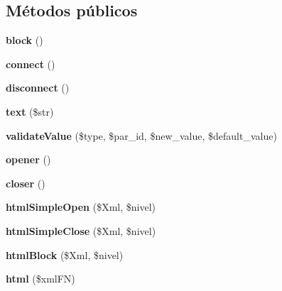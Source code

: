 \subsection*{Métodos públicos}
\begin{DoxyCompactItemize}
\item 
\mbox{\label{classblock_a9b390283efee92f54e6eed6c281155ad}} 
{\bfseries block} ()
\item 
\mbox{\label{classblock_a975c7c9239a25602f4b457fdc430762f}} 
{\bfseries connect} ()
\item 
\mbox{\label{classblock_ae34fbb646315421ae48a336986ffe664}} 
{\bfseries disconnect} ()
\item 
\mbox{\label{classblock_a079f285ef5aaeee792021a3850426879}} 
{\bfseries text} (\$str)
\item 
\mbox{\label{classblock_a0f1cfe5eb0f56e9c1b2a37c2ed64cf4b}} 
{\bfseries validate\+Value} (\$type, \$par\+\_\+id, \$new\+\_\+value, \$default\+\_\+value)
\item 
\mbox{\label{classblock_a3b3442844224e1bf4f576867bbf541e9}} 
{\bfseries opener} ()
\item 
\mbox{\label{classblock_ae721cd25adbb868cb7184ccdd71c919a}} 
{\bfseries closer} ()
\item 
\mbox{\label{classblock_a40a4d88a8dd0bace93b171030a3f5379}} 
{\bfseries html\+Simple\+Open} (\$Xml, \$nivel)
\item 
\mbox{\label{classblock_ade8c7b59b5d23272ee5356cf804ed6fa}} 
{\bfseries html\+Simple\+Close} (\$Xml, \$nivel)
\item 
\mbox{\label{classblock_a4b7ba71e210f75b44e7f86d5948cb1af}} 
{\bfseries html\+Block} (\$Xml, \$nivel)
\item 
\mbox{\label{classblock_a97726852fcd6a5a1383fed3294abd491}} 
{\bfseries html} (\$xml\+FN)
\item 
\mbox{\label{classblock_a5759868815bd72fdd3661f9da08d1417}} 

\end{DoxyCompactItemize}

